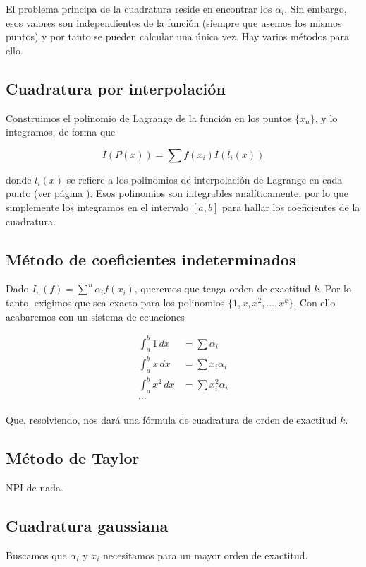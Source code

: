 \documentclass[nochap]{apuntes}
\begin{document}
El problema principa de la cuadratura reside en encontrar los $\alpha_i$. Sin embargo, esos valores son independientes  de la función (siempre que usemos los mismos puntos) y por tanto se pueden calcular una única vez. Hay varios métodos para ello.

\subsection{Cuadratura por interpolación}

Construimos el polinomio de Lagrange de la función en los puntos $\{x_n\}$, y lo integramos, de forma que 

\[ I(P(x)) = \sum f(x_i) I(l_i(x)) \]

donde $l_i(x)$ se refiere a los polinomios de interpolación de Lagrange en cada punto (ver página \pageref{polLagrange}). Esos polinomios son integrables analíticamente, por lo que simplemente los integramos en el intervalo $[a,b]$ para hallar los coeficientes de la cuadratura.

\subsection{Método de coeficientes indeterminados}

Dado $I_n(f) = \sum^n \alpha_i f(x_i)$, queremos que tenga orden de exactitud $k$. Por lo tanto, exigimos que sea exacto para los polinomios $\{1, x, x^2,\dotsc, x^k\}$. Con ello acabaremos con un sistema de ecuaciones

\begin{align*}
\int_a^b 1 \, dx &= \sum \alpha_i \\
\int_a^b x\, dx &= \sum x_i \alpha_i \\
\int_a^b x^2\, dx &= \sum x_i^2 \alpha_i \\
\cdots
\end{align*}

Que, resolviendo, nos dará una fórmula de cuadratura de orden de exactitud $k$.

\subsection{Método de Taylor}

NPI de nada.

\subsection{Cuadratura gaussiana}

Buscamos que $\alpha_i$ y $x_i$ necesitamos para un mayor orden de exactitud. 
\end{document}
